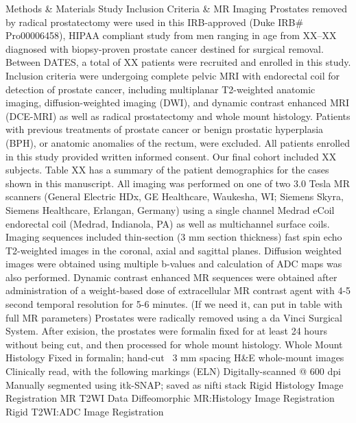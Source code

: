 Methods & Materials
Study Inclusion Criteria & MR Imaging
Prostates removed by radical prostatectomy were used in this IRB-approved (Duke IRB# Pro00006458), HIPAA compliant study from men ranging in age from XX--XX diagnosed with biopsy-proven prostate cancer destined for surgical removal. Between DATES, a total of XX patients were recruited and enrolled in this study. Inclusion criteria were undergoing complete pelvic MRI with endorectal coil for detection of prostate cancer, including multiplanar T2-weighted anatomic imaging, diffusion-weighted imaging (DWI), and dynamic contrast enhanced MRI (DCE-MRI) as well as radical prostatectomy and whole mount histology. Patients with previous treatments of prostate cancer or benign prostatic hyperplasia (BPH), or anatomic anomalies of the rectum, were excluded.  All patients enrolled in this study provided written informed consent. Our final cohort included XX subjects. Table XX has a summary of the patient demographics for the cases shown in this manuscript.
All imaging was performed on one of two 3.0 Tesla MR scanners (General Electric HDx, GE Healthcare, Waukesha, WI;  Siemens Skyra, Siemens Healthcare, Erlangan, Germany) using a single channel Medrad eCoil endorectal coil (Medrad, Indianola, PA) as well as multichannel surface coils.  Imaging sequences included thin-section (3 mm section thickness) fast spin echo T2-weighted images in the coronal, axial and sagittal planes.  Diffusion weighted images were obtained using multiple b-values and calculation of ADC maps was also performed.  Dynamic contrast enhanced MR sequences were obtained after administration of a weight-based dose of extracellular MR contrast agent with 4-5 second temporal resolution for 5-6 minutes. (If we need it, can put in table with full MR parameters)
Prostates were radically removed using a da Vinci Surgical System.  After exision, the prostates were formalin fixed for at least 24 hours without being cut, and then processed for whole mount histology.
Whole Mount Histology
Fixed in formalin; hand-cut ~3 mm spacing
H&E whole-mount images
Clinically read, with the following markings (ELN)
Digitally-scanned @ 600 dpi
Manually segmented using itk-SNAP; saved as nifti stack
Rigid Histology Image Registration
MR T2WI Data
Diffeomorphic MR:Histology Image Registration
Rigid T2WI:ADC Image Registration
